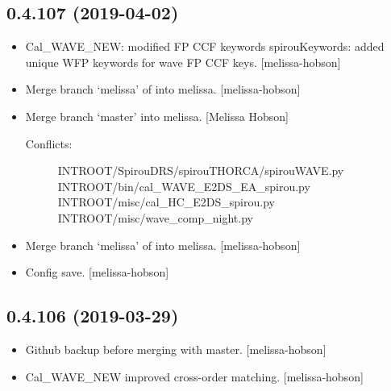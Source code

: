 \documentclass[a4paper,10pt,english]{report}
\begin{document}
\subsection{0.4.107 (2019-04-02)}
\label{\detokenize{misc/changelog:id152}}\begin{itemize}
\item {} 
Cal\_WAVE\_NEW: modified FP CCF keywords spirouKeywords: added unique
WFP keywords for wave FP CCF keys. {[}melissa-hobson{]}

\item {} 
Merge branch ‘melissa’ of  into
melissa. {[}melissa-hobson{]}

\item {} 
Merge branch ‘master’ into melissa. {[}Melissa Hobson{]}
\begin{description}
\item[{Conflicts:}] \leavevmode
INTROOT/SpirouDRS/spirouTHORCA/spirouWAVE.py
INTROOT/bin/cal\_WAVE\_E2DS\_EA\_spirou.py
INTROOT/misc/cal\_HC\_E2DS\_spirou.py
INTROOT/misc/wave\_comp\_night.py

\end{description}

\item {} 
Merge branch ‘melissa’ of  into
melissa. {[}melissa-hobson{]}

\item {} 
Config save. {[}melissa-hobson{]}

\end{itemize}


\subsection{0.4.106 (2019-03-29)}
\label{\detokenize{misc/changelog:id153}}\begin{itemize}
\item {} 
Github backup before merging with master. {[}melissa-hobson{]}

\item {} 
Cal\_WAVE\_NEW improved cross-order matching. {[}melissa-hobson{]}

\end{itemize}
\end{document}
